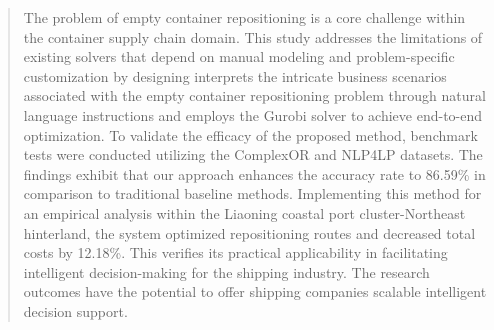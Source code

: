 \documentclass[preprint,12pt]{elsarticle}
\begin{document}
\begin{frontmatter}



\begin{abstract}
The problem of empty container repositioning is a core challenge within the container supply chain domain. This study addresses the limitations of existing solvers that depend on manual modeling and problem-specific customization by designing  interprets the intricate business scenarios associated with the empty container repositioning problem through natural language instructions and employs the Gurobi solver to achieve end-to-end optimization. To validate the efficacy of the proposed method, benchmark tests were conducted utilizing the ComplexOR and NLP4LP datasets. The findings exhibit that our approach enhances the accuracy rate to 86.59\% in comparison to traditional baseline methods. Implementing this method for an empirical analysis within the Liaoning coastal port cluster-Northeast hinterland, the system optimized repositioning routes and decreased total costs by 12.18\%. This verifies its practical applicability in facilitating intelligent decision-making for the shipping industry. The research outcomes have the potential to offer shipping companies scalable intelligent decision support.
\end{abstract}



\end{frontmatter}
\end{document}
